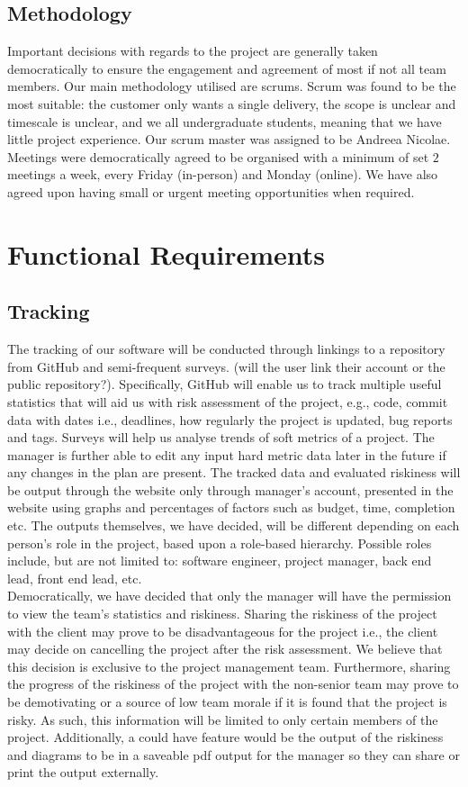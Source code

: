 \documentclass[a4paper]{article}
\theoremstyle{plain}
\theoremstyle{definition}
\theoremstyle{remark}
\begin{document}
\subsection{Methodology}
Important decisions with regards to the project are generally taken democratically to ensure the engagement and agreement of most if not all team members. Our main methodology utilised are scrums. Scrum was found to be the most suitable: the customer only wants a single delivery, the scope is unclear and timescale is unclear, and we all undergraduate students, meaning that we have little project experience. Our scrum master was assigned to be Andreea Nicolae. Meetings were democratically agreed to be organised with a minimum of set $2 $ meetings a week, every Friday (in-person) and Monday (online). We have also agreed upon having small or urgent meeting opportunities when required.
\section{Functional Requirements}
\subsection{Tracking}
The tracking of our software will be conducted through linkings to a repository from GitHub and semi-frequent surveys. (will the user link their account or the public repository?). Specifically, GitHub will enable us to track multiple useful statistics that will aid us with risk assessment of the project, e.g., code, commit data with dates i.e., deadlines, how regularly the project is updated, bug reports and tags. Surveys will help us analyse trends of soft metrics of a project. The manager is further able to edit any input hard metric data later in the future if any changes in the plan are present. The tracked data and evaluated riskiness will be output through the website only through manager's account, presented in the website using graphs and percentages of factors such as budget, time, completion etc. The outputs themselves, we have decided, will be different depending on each person's role in the project, based upon a role-based hierarchy. Possible roles include, but are not limited to: software engineer, project manager, back end lead, front end lead, etc. \\

\noindent Democratically, we have decided that only the manager will have the permission to view the team's statistics and riskiness. Sharing the riskiness of the project with the client may prove to be disadvantageous for the project i.e., the client may decide on cancelling the project after the risk assessment. We believe that this decision is exclusive to the project management team. Furthermore, sharing the progress of the riskiness of the project with the non-senior team may prove to be demotivating or a source of low team morale if it is found that the project is risky. As such, this information will be limited to only certain members of the project. Additionally, a could have feature would be the output of the riskiness and diagrams to be in a saveable pdf output for the manager so they can share or print the output externally.
\end{document}
